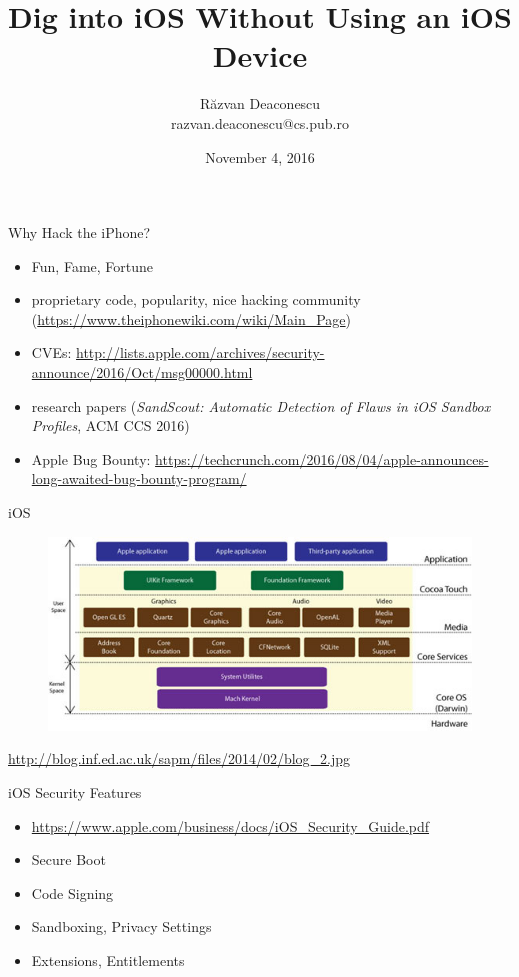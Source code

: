 \documentclass{beamer}
\title[Dig into iOS]{Dig into iOS Without Using an iOS Device}
\institute{PR204/ED217 Escape}
\author[Răzvan Deaconescu]{Răzvan Deaconescu \\
razvan.deaconescu@cs.pub.ro}
\date{November 4, 2016}
\begin{document}
\frame{\titlepage}

\begin{frame}{Why Hack the iPhone?}
  \begin{itemize}
    \pause \item Fun, Fame, Fortune
    \pause \item proprietary code, popularity, nice hacking community (\url{https://www.theiphonewiki.com/wiki/Main_Page})
    \pause \item CVEs: \url{http://lists.apple.com/archives/security-announce/2016/Oct/msg00000.html}
    \pause \item research papers (\textit{SandScout: Automatic Detection of Flaws in iOS Sandbox Profiles}, ACM CCS 2016)
    \pause \item Apple Bug Bounty: \url{https://techcrunch.com/2016/08/04/apple-announces-long-awaited-bug-bounty-program/}
  \end{itemize}
\end{frame}

\begin{frame}{iOS}
  \begin{figure}
    \centering
    \includegraphics[width=\textwidth]{img/ios-architecture}
  \end{figure}
  \vspace{1cm}
  \centering
  \footnotesize{\url{http://blog.inf.ed.ac.uk/sapm/files/2014/02/blog_2.jpg}}
\end{frame}

\begin{frame}{iOS Security Features}
  \begin{itemize}
    \item \url{https://www.apple.com/business/docs/iOS_Security_Guide.pdf}
    \item Secure Boot
    \item Code Signing
    \item Sandboxing, Privacy Settings
    \item Extensions, Entitlements
  \end{itemize}
\end{frame}
\end{document}
